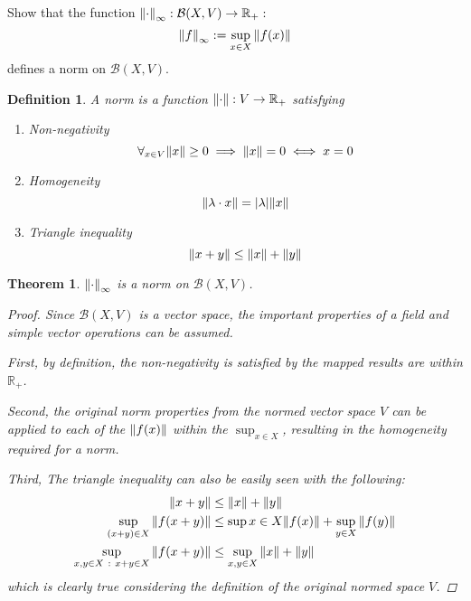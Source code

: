 \documentclass[]{article}
\newcommand{\R}{\mathbb{R}}
\newcommand{\st}{\ : \ }
\newtheorem{definition}{Definition}
\newtheorem{theorem}{Theorem}
\begin{document}
\subsection{}
Show that the function $\norm{\cdot}_\infty : \mathcal{B}(X,V) \to \R_{+} :$
\[
    \norm{f}_\infty := \sup_{x\in X} \norm{f(x)}
\]
defines a norm on $\mathcal{B}(X,V)$.

\begin{definition}
    A \emph{norm} is a function $\norm{\cdot} : V \to \R_{+}$ satisfying
    \begin{enumerate}
        \item Non-negativity 
            \[\forall_{x\in V} \norm{x} \geq 0 \implies \norm{x} = 0 \iff x = 0\]
        \item Homogeneity 
            \[\norm{\lambda \cdot x} = \abs{\lambda} \norm{x}\]
        \item Triangle inequality 
            \[\norm{x + y} \leq \norm{x} + \norm{y}\]
    \end{enumerate}
\end{definition}

\begin{theorem}
    $\norm{\cdot}_\infty$ is a norm on $\mathcal{B}(X,V)$.
    \begin{proof}
        Since $\mathcal{B}(X,V)$ is a vector space, the important properties of a field and simple vector operations can be assumed.

        First, by definition, the non-negativity is satisfied by the mapped results are within $\R_+$.

        Second, the original norm properties from the normed vector space $V$ can be applied to each of the $\norm{f(x)}$ within the $\sup_{x \in X}$, resulting in the homogeneity required for a norm.

        Third, The triangle inequality can also be easily seen with the following:
        \begin{align*}
            \norm{x + y} 
                &\leq \norm{x} + \norm{y}\\
            \sup_{(x + y) \in X} \norm{f(x + y)}
                &\leq \sup{x \in X} \norm{f(x)} + \sup_{y \in X} \norm{f(y)}\\
            \sup_{x,y \in X \st x+y \in X} \norm{f(x + y)}
                &\leq \sup_{x,y \in X} \norm{x} + \norm{y}
        \end{align*}
        which is clearly true considering the definition of the original normed space $V$.
    \end{proof}
\end{theorem}
\end{document}
